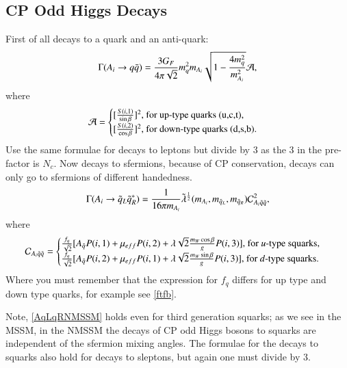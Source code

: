 \documentclass[final,3p,times]{elsarticle}
\begin{document}
\subsection{CP Odd Higgs Decays}

First of all decays to a quark and an anti-quark:
\begin{equation} \label{AqqNMSSM}
\Gamma(A_{i} \rightarrow q \bar{q}) = {3 G_{F} \over 4 \pi \sqrt {2}} m_{q}^2 m_{A_i} \sqrt{1- {4m_{q}^2 \over m_{A_i}^2}} \mathcal{A},
\end{equation}
where 
\begin{equation}
\mathcal{A} = \begin{cases}
				[{S(i,1) \over \sin\beta}]^2 $, for up-type quarks (u,c,t), $ \\
				[{S(i,2) \over \cos\beta}]^2 $, for down-type quarks (d,s,b)$.	\\
				\end{cases}
\end{equation}			
Use the same formulae for decays to leptons but divide by 3 as the 3 in the pre-factor is $N_c$.
Now decays to sfermions, because of CP conservation, decays can only go to sfermions of different handedness.
\begin{equation} \label{AqLqRNMSSM}
\Gamma(A_{i} \rightarrow \tilde{q}_L \tilde{q}_R^*) = {1 \over 16 \pi m_{A_i}} \tilde{\lambda}^{1 \over 2}(m_{A_i}, m_{\tilde{q}_L}, m_{\tilde{q}_R}) \mathcal{C}_{A_{i}\tilde{q}\tilde{q}}^2,
\end{equation}
where 
\begin{equation}
\mathcal{C}_{A_{i}\tilde{q}\tilde{q}} = \begin{cases}
										{f_{q} \over \sqrt{2}} [A_{\tilde{q}} P(i,1) + \mu_{eff}P(i,2) + \lambda \sqrt{2} {m_{W} \cos\beta \over g} P(i,3)] $, for $u$-type squarks,$ \\
										{f_{q} \over \sqrt{2}} [A_{\tilde{q}} P(i,2) + \mu_{eff}P(i,1) + \lambda \sqrt{2} {m_{W} \sin\beta \over g} P(i,3)] $, for $d$-type squarks$. \\
										\end{cases}
\end{equation}
Where you must remember that the expression for $f_{q}$ differs for up type and down type quarks, for example see \eqref{ftfb}.

Note, \eqref{AqLqRNMSSM} holds even for third generation squarks; as we see in the MSSM, in the NMSSM the decays of CP odd Higgs bosons to squarks are independent of the sfermion mixing angles.
The formulae for the decays to squarks also hold for decays to sleptons, but again one must divide by 3.
\end{document}
